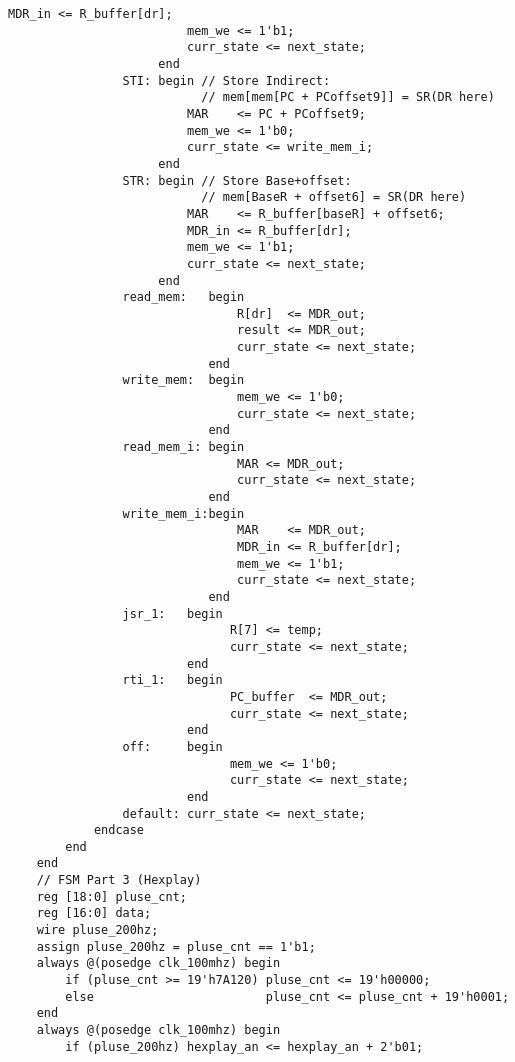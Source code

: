 \documentclass[UTF8,fontset=fandol]{ctexart}
\begin{document}
\begin{lstlisting}[style = verilogstyle, caption = 模块文件源代码, label = Code:Source, breaklines = true]
                         MDR_in <= R_buffer[dr];
                         mem_we <= 1'b1;
                         curr_state <= next_state;
                     end
                STI: begin // Store Indirect: 
                           // mem[mem[PC + PCoffset9]] = SR(DR here)
                         MAR    <= PC + PCoffset9;
                         mem_we <= 1'b0;
                         curr_state <= write_mem_i;
                     end
                STR: begin // Store Base+offset: 
                           // mem[BaseR + offset6] = SR(DR here)
                         MAR    <= R_buffer[baseR] + offset6;
                         MDR_in <= R_buffer[dr];
                         mem_we <= 1'b1;
                         curr_state <= next_state;
                     end
                read_mem:   begin 
                                R[dr]  <= MDR_out;
                                result <= MDR_out;
                                curr_state <= next_state;
                            end
                write_mem:  begin 
                                mem_we <= 1'b0;
                                curr_state <= next_state;
                            end
                read_mem_i: begin
                                MAR <= MDR_out; 
                                curr_state <= next_state;
                            end
                write_mem_i:begin
                                MAR    <= MDR_out;
                                MDR_in <= R_buffer[dr];
                                mem_we <= 1'b1;
                                curr_state <= next_state;
                            end
                jsr_1:   begin
                               R[7] <= temp;
                               curr_state <= next_state;
                         end
                rti_1:   begin
                               PC_buffer  <= MDR_out;
                               curr_state <= next_state;
                         end
                off:     begin
                               mem_we <= 1'b0;
                               curr_state <= next_state;
                         end
                default: curr_state <= next_state;
            endcase 
        end
    end
    // FSM Part 3 (Hexplay)
    reg [18:0] pluse_cnt;
    reg [16:0] data;
    wire pluse_200hz;
    assign pluse_200hz = pluse_cnt == 1'b1;
    always @(posedge clk_100mhz) begin
        if (pluse_cnt >= 19'h7A120) pluse_cnt <= 19'h00000;
        else                        pluse_cnt <= pluse_cnt + 19'h0001;
    end
    always @(posedge clk_100mhz) begin
        if (pluse_200hz) hexplay_an <= hexplay_an + 2'b01;

\end{lstlisting}
\end{document}
